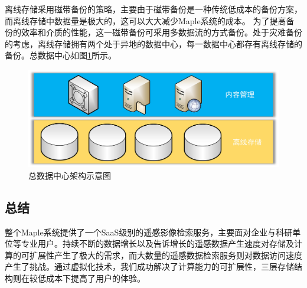\documentclass{article}
\begin{document}
离线存储采用磁带备份的策略，主要由于磁带备份是一种传统低成本的备份方案，而离线存储中数据量是极大的，这可以大大减少Maple系统的成本。 为了提高备份的效率和介质的性能，这一磁带备份可采用多数据流的方式备份。处于灾难备份的考虑，离线存储拥有两个处于异地的数据中心，每一数据中心都存有离线存储的备份。总数据中心如图\ref{all}所示。

\begin{figure}[H]
\centering 
\includegraphics[width=\textwidth]{all.jpg}
\caption{总数据中心架构示意图}
\label{all}
\end{figure}

\subsection{总结}
整个Maple系统提供了一个SaaS级别的遥感影像检索服务，主要面对企业与科研单位等专业用户。持续不断的数据增长以及告诉增长的遥感数据产生速度对存储及计算的可扩展性产生了极大的需求，而大数量的遥感数据检索服务则对数据访问速度产生了挑战。通过虚拟化技术，我们成功解决了计算能力的可扩展性，三层存储结构则在较低成本下提高了用户的体验。
\end{document}
